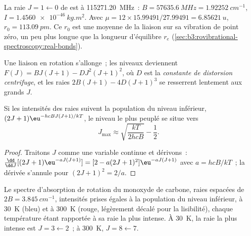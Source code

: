 \begin{example}\label{ex:b3:rovibrational-spectroscopy:co}
La raie $J = 1 \leftarrow 0$ de  est à \qty{115271.20}{MHz}~:
$B = \qty{57635.6}{MHz} = \qty{1.92252}{cm^{-1}}$, $I = \qty{1.4560e-46}{kg.m^2}$.
Avec $\mu = 12 \times 15.99491/27.99491 = \qty{6.85621}{u}$, $r_0 = \qty{113.09}{pm}$.
Ce $r_0$ est une moyenne de la liaison sur sa vibration de point zéro, un
peu plus longue que la longueur d'équilibre $r_e$
(\cref{sec:b3:rovibrational-spectroscopy:real-bonds}).
\end{example}

\begin{definition}\label{def:b3:rovibrational-spectroscopy:centrifugal}
Une liaison en rotation s'allonge~; les niveaux deviennent
$F(J) = BJ(J+1) - DJ^2(J+1)^2$,
où $D$ est la \emph{constante de distorsion centrifuge},
et les raies $2B(J+1) - 4D(J+1)^3$ se resserrent lentement aux
grands $J$.
\end{definition}

\begin{proposition}\label{prop:b3:rovibrational-spectroscopy:jmax}
Si les intensités des raies suivent la population du niveau inférieur, $(2J+1)
\eu^{-hcBJ(J+1)/kT}$, le niveau le plus peuplé se situe vers
\[
J_{\max} \approx \sqrt{\frac{kT}{2hcB}} - \frac12.
\]
\end{proposition}

\begin{proof}
Traitons $J$ comme une variable continue et dérivons~: $\frac{\dd}{\dd J}[(2J+1)\eu^{-aJ(J+1)}]
= [2 - a(2J+1)^2]\eu^{-aJ(J+1)}$ avec $a = hcB/kT$~; la dérivée s'annule
pour $(2J + 1)^2 =
2/a$.
\end{proof}

\begin{omfigure}

{\small Le spectre d'absorption de rotation du monoxyde de carbone, raies
espacées de $2B = \qty{3.845}{cm^{-1}}$, intensités prises égales à la
population du niveau inférieur, à \qty{30}{K} (bleu) et à \qty{300}{K}
(rouge, légèrement décalé pour la lisibilité), chaque température étant
rapportée à sa raie la plus intense. À \qty{30}{K}, la raie la plus
intense est
$J = 3 \leftarrow 2$~; à \qty{300}{K}, $J = 8 \leftarrow 7$.}
\end{omfigure}

